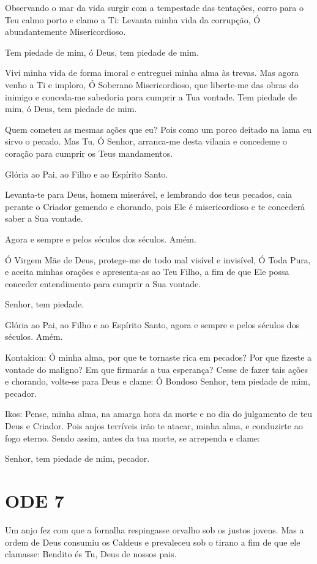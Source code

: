\documentclass{subfiles}
\begin{document}
\eirmos{}Observando o mar da vida surgir com a tempestade das tentações,
corro para o Teu calmo porto e clamo a Ti: Levanta minha vida da corrupção,
Ó abundantemente Misericordioso.

Tem piedade de mim, ó Deus, tem piedade de mim.

Vivi minha vida de forma imoral e entreguei minha alma às trevas. Mas
agora venho a Ti e imploro, Ó Soberano Misericordioso, que liberte-me das
obras do inimigo e conceda-me sabedoria para cumprir a Tua vontade.
Tem piedade de mim, ó Deus, tem piedade de mim.

Quem cometeu as mesmas ações que eu? Pois como um porco deitado na lama eu sirvo
o pecado. Mas Tu, Ó Senhor, arranca-me desta vilania e concedeme o coração para
cumprir os Teus mandamentos.

Glória ao Pai, ao Filho e ao Espírito Santo.

Levanta-te para Deus, homem miserável, e lembrando dos teus pecados, caia
perante o Criador gemendo e chorando, pois Ele é misericordioso e te concederá
saber a Sua vontade.

Agora e sempre e pelos séculos dos séculos. Amém.

Ó Virgem Mãe de Deus, protege-me de todo mal visível e invisível, Ó
Toda Pura, e aceita minhas orações e apresenta-as ao Teu Filho, a fim de que
Ele possa conceder entendimento para cumprir a Sua vontade.

Senhor, tem piedade. 

Glória ao Pai, ao Filho e ao Espírito Santo, agora e sempre e pelos
séculos dos séculos. Amém.

Kontakion: Ó minha alma, por que te tornaste rica em pecados? Por que
fizeste a vontade do maligno? Em que firmarás a tua esperança? Cesse de fazer
tais ações e chorando, volte-se para Deus e clame: Ó Bondoso Senhor, tem
piedade de mim, pecador.

Ikos: Pense, minha alma, na amarga hora da morte e no dia do julgamento de teu
Deus e Criador. Pois anjos terríveis irão te atacar, minha alma, e conduzirte ao
fogo eterno. Sendo assim, antes da tua morte, se arrependa e clame:

Senhor, tem piedade de mim, pecador.

\section{ODE 7}

\eirmos{}Um anjo fez com que a fornalha respingasse orvalho sob os justos
jovens. Mas a ordem de Deus consumiu os Caldeus e prevaleceu sob o tirano
a fim de que ele clamasse: Bendito és Tu, Deus de nossos pais.
\end{document}
